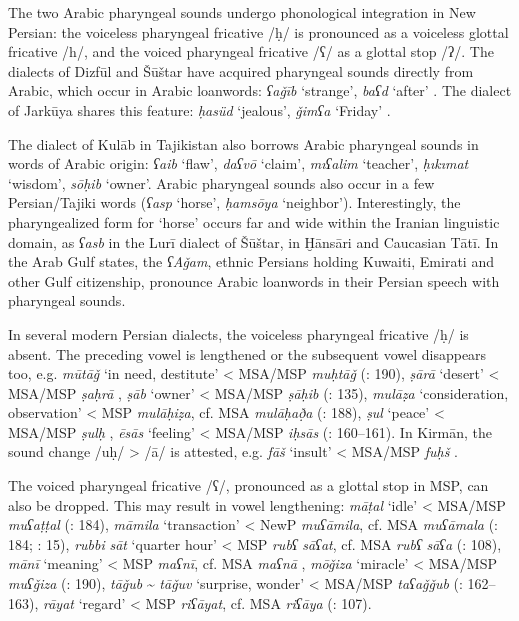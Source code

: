 \documentclass[output=paper]{langsci/langscibook}
\begin{document}

The two Arabic pharyngeal sounds undergo phonological integration in New Persian: the voiceless pharyngeal fricative /ḥ/ is pronounced as a voiceless glottal fricative /h/, and the voiced pharyngeal fricative /ʕ/ as a glottal stop /ʔ/. The dialects of Dizfūl and Šūštar have acquired pharyngeal sounds directly from Arabic, which occur in Arabic loanwords: \textit{ʕaǧīb} ‘strange’, \textit{baʕd} ‘after’ \citep{MacKinnon2015}. The dialect of Jarkūya shares this feature: \textit{ḥasüd} ‘jealous’, \textit{ǧimʕa} ‘Friday’ \citep{Borjian2008}.

The dialect of Kulāb in Tajikistan also borrows Arabic pharyngeal sounds in words of Arabic origin: \textit{ʕaib} ‘flaw’, \textit{daʕvō} ‘claim’, \textit{mıʕalim} ‘teacher’, \textit{ḥıkımat} ‘wisdom’, \textit{sōḥib} ‘owner’. Arabic pharyngeal sounds also occur in a few Persian/Tajiki words (\textit{ʕasp} ‘horse’, \textit{ḥamsōya} ‘neighbor’). Interestingly, the pharyngealized form for ‘horse’ occurs far and wide within the Iranian linguistic domain, as \textit{ʕasb} in the Lurī dialect of Šūštar, in Ḫānsāri and Caucasian Tātī. In the Arab Gulf states, the \textit{ʕAǧam}, ethnic Persians holding Kuwaiti, Emirati and other Gulf citizenship, pronounce Arabic loanwords in their Persian speech with pharyngeal sounds.


In several modern Persian dialects, the voiceless pharyngeal fricative /ḥ/ is absent. The preceding vowel is lengthened or the subsequent vowel disappears too, e.g. \textit{mūtāǧ} ‘in need, destitute’ < MSA/MSP \textit{muḥtāǧ} (\citealt{Īzadpanāh2001}: 190), \textit{ṣārā} ‘desert’ < MSA/MSP \textit{ṣaḥrā} \citep[15]{Sarlak2002}, \textit{ṣāb} ‘owner’ < MSA/MSP \textit{ṣāḥib} (\citealt{Ṣarrāfī1996}: 135), \textit{mulāẓa} ‘consideration, observation’ < MSP \textit{mulāḥiẓa}, cf. MSA \textit{mulāḥað̣a} (\citealt{Ṣarrāfī1996}: 188), \textit{ṣul} ‘peace’ < MSA/MSP \textit{ṣulḥ} \citep{Stilo2001}, \textit{ēsās} ‘feeling’ < MSA/MSP \textit{iḥsās} (\citealt{Salāmī2004}: 160–161). In Kirmān, the sound change /uḥ/ > /ā/ is attested, e.g. \textit{fāš} ‘insult’ < MSA/MSP \textit{fuḥš} \citep{Borjian2017}.

    The voiced pharyngeal fricative /ʕ/, pronounced as a glottal stop in MSP, can also be dropped. This may result in vowel lengthening: \textit{māṭal} ‘idle’ < MSA/MSP \textit{muʕaṭṭal} (\citealt{Ṣarrāfī1996}: 184), \textit{māmila} ‘transaction’ < NewP \textit{muʕāmila}, cf. MSA \textit{muʕāmala} (\citealt{Ṣarrāfī1996}: 184; \citealt{Sarlak2002}: 15), \textit{rubbi} \textit{sāt} ‘quarter hour’ < MSP \textit{rubʕ} \textit{sāʕat}, cf. MSA \textit{rubʕ} \textit{sāʕa} (\citealt{Ṣarrāfī1996}: 108), \textit{mānī} ‘meaning’ < MSP \textit{maʕnī}, cf. MSA \textit{maʕnā} \citep[15]{Sarlak2002}, \textit{mōǧiza} ‘miracle’ < MSA/MSP \textit{muʕǧiza} (\citealt{Īzadpanāh2001}: 190), \textit{tāǧub} \~{} \textit{tāǧuv} ‘surprise, wonder’ < MSA/MSP \textit{taʕaǧǧub} (\citealt{Salāmī2004}: 162–163), \textit{rāyat} ‘regard’ < MSP \textit{riʕāyat}, cf. MSA \textit{riʕāya} (\citealt{Ṣarrāfī1996}: 107).
\end{document}
